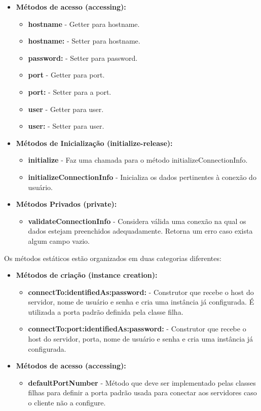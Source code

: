 \begin{itemize}
	\item \textbf{Métodos de acesso (accessing):}
	\begin{itemize}
		\item \textbf{hostname} - Getter para hostname.
		\item \textbf{hostname:} - Setter para hostname.
		\item \textbf{password:} - Setter para password.
		\item \textbf{port} - Getter para port.
		\item \textbf{port:} - Setter para a port.
		\item \textbf{user} - Getter para user.
		\item \textbf{user:} - Setter para user.
	\end{itemize}
	\item \textbf{Métodos de Inicialização (initialize-release):}
	\begin{itemize}
		\item \textbf{initialize} - Faz uma chamada para o método initializeConnectionInfo.
		\item \textbf{initializeConnectionInfo} - Inicializa os dados pertinentes à conexão do usuário.
	\end{itemize}
	\item \textbf{Métodos Privados (private):}
	\begin{itemize}
		\item \textbf{validateConnectionInfo} - Considera válida uma conexão na qual os dados estejam preenchidos adequadamente. Retorna um erro caso exista algum campo vazio.
	\end{itemize}
\end{itemize}
Os métodos estáticos estão organizados em duas categorias diferentes:
\begin{itemize}
	\item \textbf{Métodos de criação (instance creation):}
	\begin{itemize}
		\item \textbf{connectTo:identifiedAs:password:} - Construtor que recebe o host do servidor, nome de usuário e senha e cria uma instância já configurada. É utilizada a porta padrão definida pela classe filha.
		\item \textbf{connectTo:port:identifiedAs:password:} - Construtor que recebe o host do servidor, porta, nome de usuário e senha e cria uma instância já configurada. 
	\end{itemize}
	\item \textbf{Métodos de acesso (accessing):}
	\begin{itemize}
		\item \textbf{defaultPortNumber} - Método que deve ser implementado pelas classes filhas para definir a porta padrão usada para conectar aos servidores caso o cliente não a configure.
	\end{itemize}
\end{itemize}

